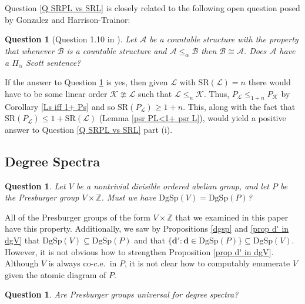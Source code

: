\documentclass{amsart}%
\numberwithin{theorem}{section}
\newtheorem{question}[theorem]{Question}
\newcommand{\Z}{\mathbb{Z}}
\newcommand{\A}{\mathcal{A}}
\newcommand{\B}{\mathcal{B}}
\newcommand{\0}{\emptyset}
\newcommand{\ddd}{\boldsymbol{d}}
\newcommand{\LL}{\mathcal{L}}
\newcommand{\dgsp}{\text{DgSp}}
\newcommand{\SR}{\text{SR}}
\newcommand{\K}{\mathcal{K}}
\begin{document}
Question \ref{Q SRPL vs SRL} is closely related to the following open question posed by Gonzalez and Harrison-Trainor:

\begin{question}[Question 1.10 in \cite{spectral-gaps}]
 \label{Q david/matthew}
 Let $\A$ be a countable structure with the property that whenever $\B$ is a countable structure and
$\A\leq_\alpha \B$ then $\B\cong \A$. Does $\A$ have a $\Pi_\alpha$ Scott sentence?
     
 \end{question}

If the answer to Question \ref{Q david/matthew} is yes, then given $\LL$ with $\SR(\LL)=n$ there would have to be some linear order $\K\ncong \LL$ such that $\LL\leq_{n} \K$. Thus, $P_\LL\leq_{1+n} P_\K$ by Corollary \ref{Ls iff 1+ Ps} and so $\SR(P_\LL)\geq 1+n$. This, along with the fact that $\SR(P_\LL)\leq 1+   \SR(\LL)$ (Lemma \ref{psr PL<1+ psr L}), would yield a positive answer to Question \ref{Q SRPL vs SRL} part (i).    

\subsection{Degree Spectra}

\begin{question}
\label{Q dgsp V vs dgsp P}
    Let $V$ be a nontrivial divisible ordered abelian group, and let $P$ be the Presburger group $V\times \Z$. Must we have $\dgsp(V)=\dgsp(P)$? 
\end{question}

All of the Presburger groups of the form $V\times \Z$ that we examined in this paper have this property. Additionally, we saw by Propositions \ref{dgsp} and \ref{prop d' in dgV} that $\dgsp(V)\subseteq\dgsp(P)$ and that $\{\ddd':\ddd\in \dgsp(P)\}\subseteq \dgsp(V)$. However, it
is not obvious how to strengthen Proposition \ref{prop d' in dgV}. Although $V$ is always co-c.e.\ in $P$, it is not clear how to computably enumerate $V$ given the atomic diagram of $P$.

\begin{question}
\label{Q universal dgsp}
    Are Presburger groups universal for degree spectra?
\end{question}
\end{document}
